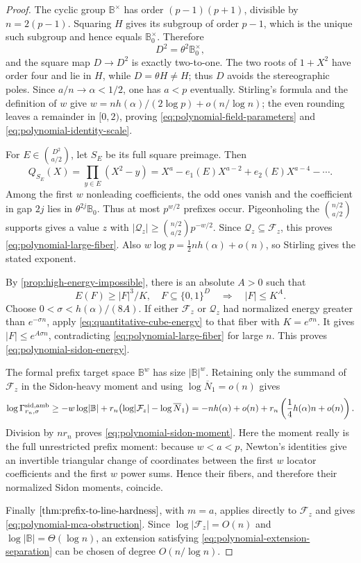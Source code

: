 \documentclass[12pt,a4paper]{amsart}
\numberwithin{equation}{section}
\theoremstyle{remark}
\newcommand{\B}{\mathbb B}
\newcommand{\Fcal}{\mathcal F}
\newcommand{\Qcal}{\mathcal Q}
\newcommand{\barN}{\overline N}
\newcommand{\abs}[1]{\lvert #1\rvert}
\begin{document}
\begin{proof}
The cyclic group \(\B^\times\) has order \((p-1)(p+1)\), divisible by
\(n=2(p-1)\).  Squaring \(H\) gives its subgroup of order \(p-1\), which
is the unique such subgroup and hence equals \(\B_0^\times\).  Therefore
\[
 D^2=\theta^2\B_0^\times,
 \tag{6.9}\label{eq:square-quotient-domain}
\]
and the square map \(D\to D^2\) is exactly two-to-one.  The two roots of
\(1+X^2\) have order four and lie in \(H\), while \(D=\theta H\ne H\);
thus \(D\) avoids the stereographic poles.  Since
\(a/n\to\alpha<1/2\), one has \(a<p\) eventually.  Stirling's formula and
the definition of \(w\) give
\(w=nh(\alpha)/(2\log p)+o(n/\log n)\); the even rounding leaves a
remainder in \([0,2)\), proving
\eqref{eq:polynomial-field-parameters} and
\eqref{eq:polynomial-identity-scale}.

For \(E\in\binom{D^2}{a/2}\), let \(S_E\) be its full square preimage.
Then
\[
 Q_{S_E}(X)=\prod_{y\in E}(X^2-y)
 =X^a-e_1(E)X^{a-2}+e_2(E)X^{a-4}-\cdots .
 \tag{6.10}\label{eq:polynomial-even-locator}
\]
Among the first \(w\) nonleading coefficients, the odd ones vanish and
the coefficient in gap \(2j\) lies in
\(\theta^{2j}\B_0\).  Thus at most \(p^{w/2}\) prefixes occur.  Pigeonholing
the \(\binom{n/2}{a/2}\) supports gives a value \(z\) with
\(\abs{\Qcal_z}\ge\binom{n/2}{a/2}p^{-w/2}\).  Since
\(\Qcal_z\subseteq\Fcal_z\), this proves
\eqref{eq:polynomial-large-fiber}.  Also
\(w\log p=\tfrac12nh(\alpha)+o(n)\), so Stirling gives the stated
exponent.

By \cref{prop:high-energy-impossible}, there is an absolute \(A>0\) such
that
\[
 E(F)\ge\abs F^3/K,\quad F\subseteq\{0,1\}^D
 \quad\Longrightarrow\quad \abs F\le K^A.
 \tag{6.11}\label{eq:quantitative-cube-energy}
\]
Choose \(0<\sigma<h(\alpha)/(8A)\).  If either
\(\Fcal_z\) or \(\Qcal_z\) had normalized energy greater than
\(e^{-\sigma n}\), apply \eqref{eq:quantitative-cube-energy} to that
fiber with \(K=e^{\sigma n}\).  It gives
\(\abs F\le e^{A\sigma n}\), contradicting
\eqref{eq:polynomial-large-fiber} for large \(n\).  This proves
\eqref{eq:polynomial-sidon-energy}.

The formal prefix target space \(\B^w\) has size \(\abs\B^w\).  Retaining only the
summand of \(\Fcal_z\) in the Sidon-heavy moment and using
\(\log\barN_1=o(n)\) gives
\[
 \log\Gamma^{\rm sid,amb}_{r_n,\sigma}
 \ge-w\log\abs\B+
 r_n\bigl(\log\abs{\Fcal_z}-\log\barN_1\bigr)
 =-nh(\alpha)+o(n)
  +r_n\left(\frac14h(\alpha)n+o(n)\right).
\]
Division by \(nr_n\) proves \eqref{eq:polynomial-sidon-moment}.
Here the moment really is the full unrestricted prefix moment: because
\(w<a<p\), Newton's identities give an invertible triangular change of
coordinates between the first \(w\) locator coefficients and the first
\(w\) power sums.  Hence their fibers, and therefore their normalized
Sidon moments, coincide.

Finally \(\cref{thm:prefix-to-line-hardness}\), with
\(m=a\), applies directly to \(\Fcal_z\) and gives
\eqref{eq:polynomial-mca-obstruction}.  Since
\(\log\abs{\Fcal_z}=O(n)\) and \(\log\abs\B=\Theta(\log n)\), an extension
satisfying \eqref{eq:polynomial-extension-separation} can be chosen of
degree \(O(n/\log n)\).
\end{proof}
\end{document}
